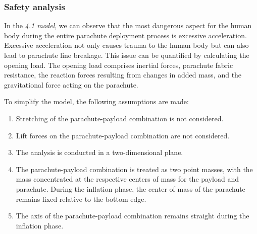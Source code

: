 \documentclass[12pt]{article}
\begin{document}
\subsubsection{Safety analysis}

In the \textit{4.1 model}, we can observe that the most dangerous aspect for the human body during the entire 
parachute deployment process is excessive acceleration. Excessive acceleration not only causes trauma 
to the human body but can also lead to parachute line breakage. This issue can be quantified by 
calculating the opening load. The opening load comprises inertial forces, parachute fabric resistance, 
the reaction forces resulting from changes in added mass, and the gravitational force acting on the 
parachute.

To simplify the model, the following assumptions are made:
\begin{enumerate}
    \item Stretching of the parachute-payload combination is not considered.
    \item Lift forces on the parachute-payload combination are not considered.
    \item The analysis is conducted in a two-dimensional plane.
    \item The parachute-payload combination is treated as two point masses, with the mass concentrated at the 
    respective centers of mass for the payload and parachute. During the inflation phase, 
    the center of mass of the parachute remains fixed relative to the bottom edge.
    \item The axis of the parachute-payload combination remains straight during the inflation phase.
\end{enumerate}
\end{document}
